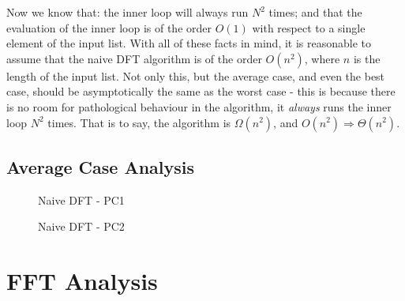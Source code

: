 \documentclass[]{article}
\begin{document}
Now we know that: the inner loop will always run $N^2$ times; and that the evaluation of the inner loop is of the order $O(1)$ with respect to a single element of the input list. With all of these facts in mind, it is reasonable to assume that the naive DFT algorithm is of the order $O(n^2)$, where $n$ is the length of the input list. Not only this, but the average case, and even the best case, should be asymptotically the same as the worst case - this is because there is no room for pathological behaviour in the algorithm, it \emph{always} runs the inner loop $N^2$ times. That is to say, the algorithm is $\Omega(n^2)$, and $O(n^2) \Rightarrow \Theta(n^2)$.

\subsection{Average Case Analysis}\label{sec:dft-average}

\begin{figure}[!htbp]
	\centering
	\begin{minipage}[b]{0.4\textwidth}
		\caption{Naive DFT - PC1\label{fig:compar1}}
	\end{minipage}
	\hfill
	\begin{minipage}[b]{0.4\textwidth}
		\caption{Naive DFT - PC2\label{fig:compar2}}
	\end{minipage}
\end{figure}

\section{FFT Analysis}\label{sec:fft}
\end{document}
